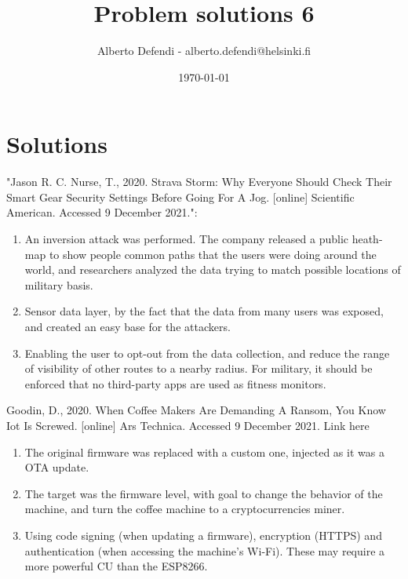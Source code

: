 \documentclass[a4paper, 12pt]{article}
\title{Problem solutions 6}
\author{Alberto Defendi - alberto.defendi@helsinki.fi}
\date{\today}
\begin{document}
\maketitle

\section{Solutions} %
\label{sec:solutions}
\begin{exercise}
"Jason R. C. Nurse, T., 2020. Strava Storm: Why Everyone Should Check
Their Smart Gear Security Settings Before Going For A Jog. [online] Scientific
American. Accessed 9 December 2021.":
\begin{enumerate}
    \item An inversion attack was performed. The company 
		released a public heath-map to show people common paths that the
		users were doing around the world, and researchers analyzed the data
		trying to match possible locations of military basis.
	\item Sensor data layer, by the fact that the data from many users was
		exposed, and created an easy base for the attackers.
	\item Enabling the user to opt-out from the data collection, and reduce the
		range of visibility of other routes to a nearby radius. For military, it
		should be enforced that no third-party apps are used as fitness
		monitors. 
\end{enumerate}

Goodin, D., 2020. When Coffee Makers Are Demanding A Ransom, You Know Iot Is Screwed. [online]
Ars Technica. Accessed 9 December 2021. Link here
\begin{enumerate}
    \item The original firmware was replaced with a custom one, injected as it
		was a OTA update.
	\item The target was the firmware level, with goal to change the behavior of the
		machine, and turn the coffee machine to a cryptocurrencies miner. 
	\item Using code signing (when updating a firmware), encryption (HTTPS) and
		authentication (when accessing the machine's Wi-Fi). These may require a
		more powerful CU than the ESP8266.
\end{enumerate}

\end{exercise}
\end{document}
